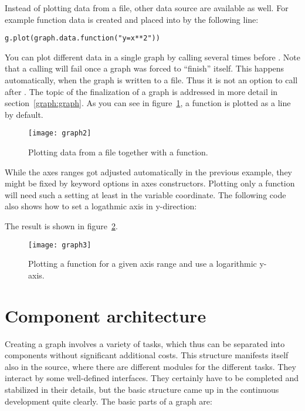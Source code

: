 Instead of plotting data from a file, other data source are available
as well. For example function data is created and placed into
 by the following line:
\begin{verbatim}
g.plot(graph.data.function("y=x**2"))
\end{verbatim}
You can plot different data in a single graph by calling
 several times before . Note
that a calling  will fail once a graph was forced to
``finish'' itself. This happens automatically, when the graph is
written to a file. Thus it is not an option to call 
after . The topic of the finalization of a
graph is addressed in more detail in section~\ref{graph:graph}. As you
can see in figure~\ref{fig:graph2}, a function is plotted as a line by
default.

\begin{figure}[ht]
\centerline{\texttt{[image: graph2]}}
\caption{Plotting data from a file together with a function.}
\label{fig:graph2}
\end{figure}

While the axes ranges got adjusted automatically in the previous
example, they might be fixed by keyword options in axes constructors.
Plotting only a function will need such a setting at least in the
variable coordinate. The following code also shows how to set a
logathmic axis in y-direction:



The result is shown in figure~\ref{fig:graph3}.

\begin{figure}[ht]
\centerline{\texttt{[image: graph3]}}
\caption{Plotting a function for a given axis range and use a
logarithmic y-axis.}
\label{fig:graph3}
\end{figure} %

\section{Component architecture} %
\label{graph:components}

Creating a graph involves a variety of tasks, which thus can be
separated into components without significant additional costs.
This structure manifests itself also in the \PyX{} source, where there
are different modules for the different tasks. They interact by some
well-defined interfaces. They certainly have to be completed and
stabilized in their details, but the basic structure came up in the
continuous development quite clearly. The basic parts of a graph are:

